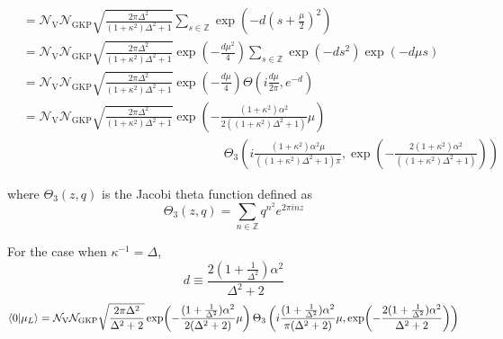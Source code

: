 \documentclass[11pt]{article}
\begin{document}
\begin{align*}
    \\
                                     & = \mathcal{N}_{\mathrm{V}} \mathcal{N}_{\mathrm{GKP}} \sqrt{\frac{2\pi\Delta^2}{(1 + \kappa^2)\Delta^2 + 1}} \sum_{s \in \mathbb{Z}}  \exp\!\left(-d\left(s + \frac{\mu}{2}\right)^2\right)
    \\
                                     & = \mathcal{N}_{\mathrm{V}} \mathcal{N}_{\mathrm{GKP}} \sqrt{\frac{2\pi\Delta^2}{(1 + \kappa^2)\Delta^2 + 1}}  \exp\!\left(-\frac{d \mu^2}{4}\right) \sum_{s \in \mathbb{Z}} \exp\!\left(-d s^2\right) \exp\!\left(-d \mu s\right)
    \\
                                     & = \mathcal{N}_{\mathrm{V}} \mathcal{N}_{\mathrm{GKP}} \sqrt{\frac{2\pi\Delta^2}{(1 + \kappa^2)\Delta^2 + 1}}  \exp\!\left(-\frac{d \mu}{4}\right) \Theta\left(i\frac{d \mu}{2 \pi}, e^{-d}\right)
    \\
                                     & = \mathcal{N}_{\mathrm{V}} \mathcal{N}_{\mathrm{GKP}} \sqrt{\frac{2\pi\Delta^2}{(1 + \kappa^2)\Delta^2 + 1}}  \exp\!\left(-\frac{(1 + \kappa^2)\alpha^2}{2((1 + \kappa^2)\Delta^2 + 1)} \mu\right)                                                                                                                                      \\ &\qquad \qquad \qquad \qquad \qquad \qquad \qquad \qquad \Theta_3\left(i\frac{(1 + \kappa^2)\alpha^2 \mu}{((1 + \kappa^2)\Delta^2 + 1)\pi}, \exp\!\left(-\frac{2(1 + \kappa^2)\alpha^2}{((1 + \kappa^2)\Delta^2 + 1)}\right)\right)
\end{align*}

where $\Theta_3(z,q)$ is the Jacobi theta function defined as
$$\Theta_3(z,q) = \sum_{n\in\mathbb{Z}} q^{n^2} e^{2\pi i n z}$$

For the case when $\kappa^{-1} = \Delta$,
$$d \equiv \frac{2(1+\frac{1}{\Delta^2})\alpha^2}{\Delta^2 + 2}$$
$$
    \braket{0}{\mu_L} = \mathcal{N}_{\mathrm{V}} \mathcal{N}_{\mathrm{GKP}} \sqrt{\frac{2\pi\Delta^2}{\Delta^2 + 2}}  \exp\!\left(-\frac{(1+\frac{1}{\Delta^2})\alpha^2}{2(\Delta^2 + 2)} \mu\right) \Theta_3\left(i\frac{(1+\frac{1}{\Delta^2})\alpha^2}{\pi(\Delta^2 + 2)} \mu, \exp\!\left(-\frac{2(1+\frac{1}{\Delta^2})\alpha^2}{\Delta^2 + 2}\right)\right)
$$
\end{document}
